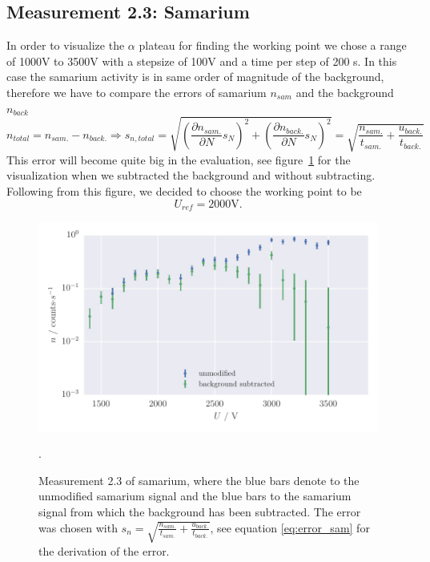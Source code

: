 \subsection{Measurement 2.3: Samarium}
\label{subsec:samarium}
In order to visualize the $\alpha$ plateau for finding the working point we chose a range of 1000V to 3500V with a stepsize of 100V and 
a time per step of 200 s. In this case the samarium activity is in same order of magnitude of the 
background, therefore we have to compare the errors of samarium $n_{sam}$ and the background $n_{back}$
\begin{equation}
    n_{total} = n_{sam.} - n_{back.} \Rightarrow  s_{n,total} 
    =\sqrt{\left( \frac{\partial n_{sam.}}{\partial N} s_N \right )^2+\left (\frac{\partial n_{back.}}{\partial N} s_N \right )^2 } 
    = \sqrt{\frac{n_{sam.}}{t_{sam.}}+\frac{u_{back.}}{t_{back.}} }
    \label{eq:error_sam}
\end{equation}
This error will become quite big in the evaluation, see figure~\ref{fig:2_3_samarium} for the visualization when we subtracted the
background and without subtracting. Following from this figure, we decided to choose the working point to be
\begin{equation}
U_{ref} = 2000 \mathrm{V}.
\end{equation}
\begin{figure}[H]
    \centering
    \includegraphics[width=\linewidth]{analysis/figures/measurement_2_2_1}
    \caption{Measurement 2.3 of samarium, where the blue bars denote to the unmodified samarium signal and the blue bars to the
    samarium signal from which the background has been subtracted.
    The error was chosen with $s_n = \sqrt{\frac{n_{sam.}}{t_{sam.}}+\frac{u_{back.}}{t_{back.}} }$, see equation \eqref{eq:error_sam} for
    the derivation of the error.}.
    \label{fig:2_3_samarium}
\end{figure}
